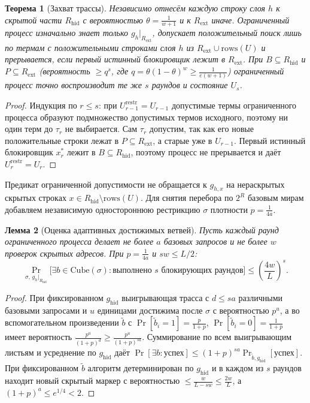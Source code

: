 \documentclass[11pt,a4paper]{article}
\newtheorem{theorem}{Теорема}[section]
\newtheorem{lemma}[theorem]{Лемма}
\theoremstyle{definition}
\theoremstyle{remark}
\newcommand{\Prb}{\Pr}
\begin{document}
\begin{theorem}[Захват трассы]
\label{thm:trace-capture-ru}
Независимо отнесём каждую строку слоя $h$ к скрытой части $R_{\mathrm{hid}}$ с вероятностью $\theta = \frac{1}{w+1}$ и к $R_{\mathrm{ext}}$ иначе. Ограниченный процесс изначально знает только $g_h|_{R_{\mathrm{ext}}}$, допускает положительный поиск лишь по термам с положительными строками слоя $h$ из $R_{\mathrm{ext}} \cup \mathrm{rows}(U)$ и прерывается, если первый истинный блокировщик лежит в $R_{\mathrm{ext}}$. При $B \subseteq R_{\mathrm{hid}}$ и $P \subseteq R_{\mathrm{ext}}$ (вероятность $\ge q^s$, где $q = \theta(1-\theta)^w \ge \frac{1}{e(w+1)}$) ограниченный процесс точно воспроизводит те же $s$ раундов и состояние $U_s$.
\end{theorem}

\begin{proof}
Индукция по $r \le s$: при $U_{r-1}^{\mathrm{restr}} = U_{r-1}$ допустимые термы ограниченного процесса образуют подмножество допустимых термов исходного, поэтому ни один терм до $\tau_r$ не выбирается. Сам $\tau_r$ допустим, так как его новые положительные строки лежат в $P \subseteq R_{\mathrm{ext}}$, а старые уже в $U_{r-1}$. Первый истинный блокировщик $x_r^*$ лежит в $B \subseteq R_{\mathrm{hid}}$, поэтому процесс не прерывается и даёт $U_r^{\mathrm{restr}} = U_r$.
\end{proof}

Предикат ограниченной допустимости не обращается к $g_{h,x}$ на нераскрытых скрытых строках $x \in R_{\mathrm{hid}} \setminus \mathrm{rows}(U)$. Для снятия перебора по $2^R$ базовым мирам добавляем независимую одностороннюю рестрикцию $\sigma$ плотности $p = \frac{1}{4a}$.

\begin{lemma}[Оценка адаптивных достижимых ветвей]
\label{lem:reachable-branch-ru}
Пусть каждый раунд ограниченного процесса делает не более $a$ базовых запросов и не более $w$ проверок скрытых адресов. При $p = \frac{1}{4a}$ и $sw \le L/2$:
\[
  \Prb_{\sigma,\, g_h|_{R_{\mathrm{hid}}}}\bigl[\exists b \in \mathrm{Cube}(\sigma) : \text{выполнено } s \text{ блокирующих раундов}\bigr]
  \le \left(\frac{4w}{L}\right)^s.
\]
\end{lemma}

\begin{proof}
При фиксированном $g_{\mathrm{hid}}$ выигрывающая трасса с $d \le sa$ различными базовыми запросами и $u$ единицами достижима после $\sigma$ с вероятностью $p^u$, а во вспомогательном произведении $\tilde{b}$ с $\Prb[\tilde{b}_i = 1] = \frac{p}{1+p}$, $\Prb[\tilde{b}_i = 0] = \frac{1}{1+p}$ имеет вероятность $\frac{p^u}{(1+p)^d} \ge \frac{p^u}{(1+p)^{sa}}$. Суммирование по всем выигрывающим листьям и усреднение по $g_{\mathrm{hid}}$ даёт $\Prb[\exists b : \text{успех}] \le (1+p)^{sa} \Prb_{\tilde{b}, g_{\mathrm{hid}}}[\text{успех}]$. При фиксированном $\tilde{b}$ алгоритм детерминирован по $g_{\mathrm{hid}}$ и в каждом из $s$ раундов находит новый скрытый маркер с вероятностью $\le \frac{w}{L - sw} \le \frac{2w}{L}$, а $(1+p)^a \le e^{1/4} < 2$.
\end{proof}
\end{document}
